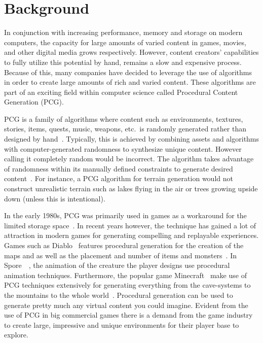 \section{Background}

In conjunction with increasing performance, memory and storage on modern computers, the capacity for large amounts of varied content in games, movies, and other digital media grows respectively.
However, content creators' capabilities to fully utilize this potential by hand, remains a slow and expensive process.
Because of this, many companies have decided to leverage the use of algorithms in order to create large amounts of rich and varied content.
These algorithms are part of an exciting field within computer science called Procedural Content Generation (PCG).

PCG is a family of algorithms where content such as environments, textures, stories, items, quests, music, weapons, etc.\ is randomly generated rather than designed by hand~\cite[p.1]{PCG_in_games}.
Typically, this is achieved by combining assets and algorithms with computer-generated randomness to synthesize unique content.
However calling it completely random would be incorrect.
The algorithm takes advantage of randomness within its manually defined constraints to generate desired content~\cite{Gamasutra}.
For instance, a PCG algorithm for terrain generation would not construct unrealistic terrain such as lakes flying in the air or trees growing upside down (unless this is intentional).
	
In the early 1980s, PCG was primarily used in games as a workaround for the limited storage space~\cite[p.4]{PCG_in_games}.
In recent years however, the technique has gained a lot of attraction in modern games for generating compelling and replayable experiences.
Games such as Diablo~\cite{diablo} features procedural generation for the creation of the maps and as well as the placement and number of items and monsters~\cite[p.4]{PCG_in_games}.
In Spore~\cite{spore}~, the animation of the creature the player designs use procedural animation techniques\cite[p.4]{PCG_in_games}.
Furthermore, the popular game Minecraft~\cite{minecraft} make use of PCG techniques extensively for generating everything from the cave-systems to the mountains to the whole world~\cite[p.4]{PCG_in_games}.
Procedural generation can be used to generate pretty much any virtual content you could imagine.
Evident from the use of PCG in big commercial games there is a demand from the game industry to create large, impressive and unique environments for their player base to explore.

